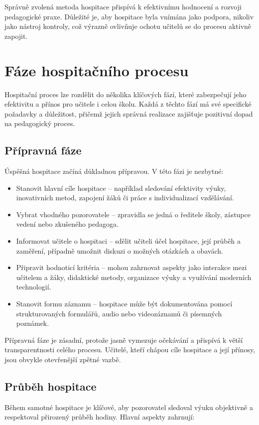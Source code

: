 Správně zvolená metoda hospitace přispívá k efektivnímu hodnocení a rozvoji pedagogické praxe. Důležité je, aby hospitace byla vnímána jako podpora, nikoliv jako nástroj kontroly, což výrazně ovlivňuje ochotu učitelů se do procesu aktivně zapojit.


\section{Fáze hospitačního procesu}

Hospitační proces lze rozdělit do několika klíčových fází, které zabezpečují jeho efektivitu a přínos pro učitele i celou školu. Každá z těchto fází má své specifické požadavky a důležitost, přičemž jejich správná realizace zajišťuje pozitivní dopad na pedagogický proces.

\subsection{Přípravná fáze}

Úspěšná hospitace začíná důkladnou přípravou. V této fázi je nezbytné:

\begin{itemize}
    \item Stanovit hlavní cíle hospitace – například sledování efektivity výuky, inovativních metod, zapojení žáků či práce s individualizací vzdělávání.
    \item Vybrat vhodného pozorovatele – zpravidla se jedná o ředitele školy, zástupce vedení nebo zkušeného pedagoga.
    \item Informovat učitele o hospitaci – sdělit učiteli účel hospitace, její průběh a zaměření, případně umožnit diskuzi o možných otázkách a obavách.
    \item Připravit hodnoticí kritéria – mohou zahrnovat aspekty jako interakce mezi učitelem a žáky, didaktické metody, organizace výuky a využívání moderních technologií.
    \item Stanovit formu záznamu – hospitace může být dokumentována pomocí strukturovaných formulářů, audio nebo videozáznamů či písemných poznámek.
\end{itemize}

Přípravná fáze je zásadní, protože jasně vymezuje očekávání a přispívá k větší transparentnosti celého procesu. Učitelé, kteří chápou cíle hospitace a její přínosy, jsou obvykle otevřenější zpětné vazbě.

\subsection{Průběh hospitace}
Během samotné hospitace je klíčové, aby pozorovatel sledoval výuku objektivně a respektoval přirozený průběh hodiny. Hlavní aspekty zahrnují:

